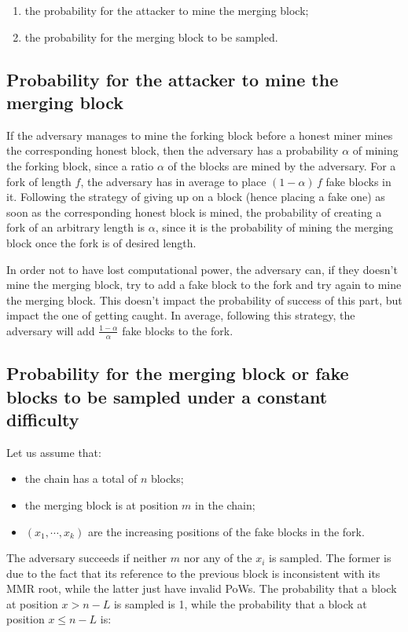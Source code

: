       \begin{enumerate}
      \item the probability for the attacker to mine the merging block;
      \item the probability for the merging block to be sampled.
      \end{enumerate}
      
      \subsection{Probability for the attacker to mine the merging block}
        If the adversary manages to mine the forking block before a honest miner mines the corresponding honest block, then the adversary has a probability \(\alpha\) of mining the forking block, since a ratio \(\alpha\) of the blocks are mined by the adversary. For a fork of length \(f\), the adversary has in average to place \((1-\alpha)\,f\) fake blocks in it. Following the strategy of giving up on a block (hence placing a fake one) as soon as the corresponding honest block is mined, the probability of creating a fork of an arbitrary length is \(\alpha\), since it is the probability of mining the merging block once the fork is of desired length.
        
        In order not to have lost computational power, the adversary can, if they doesn't mine the merging block, try to add a fake block to the fork and try again to mine the merging block. This doesn't impact the probability of success of this part, but impact the one of getting caught. In average, following this strategy, the adversary will add \(\frac{1-\alpha}{\alpha}\) fake blocks to the fork.
      \subsection{Probability for the merging block or fake blocks to be sampled under a constant difficulty}
        Let us assume that:
        \begin{itemize}
          \item the chain has a total of \(n\) blocks;
          \item the merging block is at position \(m\) in the chain;
          \item \((x_1,\cdots,x_k)\) are the increasing positions of the fake blocks in the fork.
        \end{itemize}
        
        The adversary succeeds if neither \(m\) nor any of the \(x_i\) is sampled. The former is due to the fact that its reference to the previous block is inconsistent with its MMR root, while the latter just have invalid PoWs. The probability that a block at position \(x>n - L\) is sampled is 1, while the probability that a block at position \(x\leqslant n-L\) is:
        
